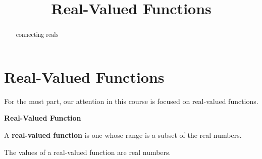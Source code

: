 \documentclass{ximera}
\title{Real-Valued Functions}
\begin{document}
\begin{abstract}
connecting reals
\end{abstract}
\maketitle




\section*{Real-Valued Functions}

For the most part, our attention in this course is focused on real-valued functions.




\begin{definition} \textbf{\textcolor{green!50!black}{Real-Valued Function}} 

A \textbf{real-valued function} is one whose range is a subset of the real numbers.

\end{definition}
The values of a real-valued function are real numbers.
\end{document}
